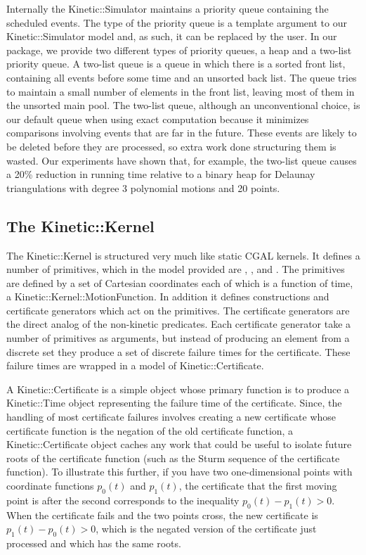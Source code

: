 Internally the Kinetic::Simulator maintains a priority queue
containing the scheduled events. The type of the priority queue is a
template argument to our Kinetic::Simulator model and, as such, it can
be replaced by the user.  In our package, we provide two different
types of priority queues, a heap and a two-list priority queue.  A
two-list queue is a queue in which there is a sorted front list,
containing all events before some time and an unsorted back list. The
queue tries to maintain a small number of elements in the front list,
leaving most of them in the unsorted main pool. The two-list queue,
although an unconventional choice, is our default queue when using
exact computation because it minimizes comparisons involving events
that are far in the future.  These events are likely to be deleted
before they are processed, so extra work done structuring them is
wasted.  Our experiments have shown that, for example, the two-list
queue causes a 20\% reduction in running time relative to a binary
heap for Delaunay triangulations with degree 3 polynomial motions and
20 points.



\subsection{The Kinetic::Kernel}

The Kinetic::Kernel is structured very much like static CGAL
kernels. It defines a number of primitives, which in the model
provided are ,
,  and
. The primitives are defined by
a set of Cartesian coordinates each of which is a function of time, a
Kinetic::Kernel::MotionFunction. In addition it defines constructions
and certificate generators which act on the primitives.  The
certificate generators are the direct analog of the non-kinetic
predicates. Each certificate generator take a number of primitives as
arguments, but instead of producing an element from a discrete set
they produce a set of discrete failure times for the certificate.
These failure times are wrapped in a model of Kinetic::Certificate.

A Kinetic::Certificate is a simple object whose primary function is to
produce a Kinetic::Time object representing the failure time of the
certificate.  Since, the handling of most certificate failures
involves creating a new certificate whose certificate function is the
negation of the old certificate function, a Kinetic::Certificate
object caches any work that could be useful to isolate future roots of
the certificate function (such as the Sturm sequence of the
certificate function). To illustrate this further, if you have two
one-dimensional points with coordinate functions $p_0(t)$ and
$p_1(t)$, the certificate that the first moving point is after the
second corresponds to the inequality $p_0(t) - p_1(t) > 0$.  When the
certificate fails and the two points cross, the new certificate is
$p_1(t)- p_0(t) > 0$, which is the negated version of the certificate
just processed and which has the same roots.


